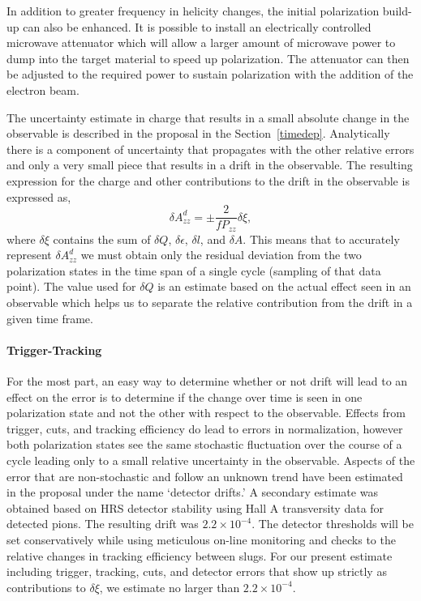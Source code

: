 In addition to greater frequency in helicity changes, the initial polarization build-up
can also be enhanced.  It is possible to install an electrically controlled microwave attenuator which will allow a larger amount of microwave power to dump into the target material to speed up polarization.  The attenuator can then be adjusted to the required power to sustain polarization with the addition of the electron beam.  

The uncertainty estimate in charge that results in a small absolute change in the observable is described
in the proposal in the Section~\ref{timedep}.  Analytically there is a component of uncertainty that propagates with the other
relative errors and only a very small piece that results in a drift in the observable.
The resulting expression for the charge and other contributions to the drift in the observable is expressed as,
\begin{equation}
\delta A^d_{zz}=\pm \frac{2}{fP_{zz}}\delta\xi,
\label{drift}
\end{equation}
where $\delta\xi$ contains the sum of $\delta Q$, $\delta \epsilon$, $\delta l$, and $\delta A$.  This means that
to accurately represent $\delta A^d_{zz}$ we must obtain only the residual deviation from the two polarization
states in the time span of a single cycle (sampling of that data point).  The value used for $\delta Q$ is an estimate based
on the actual effect seen in an observable which helps us to separate the relative contribution from the drift in a given time frame.

\paragraph{Trigger-Tracking}
\label{acc}
For the most part, an easy way to determine whether or not drift will lead to an
effect on the error is to determine if the change over time is seen in one polarization state and not the
other with respect to the observable.  Effects from trigger, cuts, and tracking efficiency do lead to errors in normalization,
however both polarization states see the same stochastic fluctuation over the course of a cycle leading only to a small relative uncertainty in the observable.  Aspects of the error that are non-stochastic
and follow an unknown trend have been estimated in the proposal under the name `detector drifts.'
A secondary estimate was obtained based on HRS detector stability using Hall A transversity data for
detected pions.  The resulting drift was $2.2\times10^{-4}$.
The detector thresholds will be set conservatively while using meticulous on-line monitoring and checks to the relative changes in tracking efficiency between slugs.  For our present estimate including trigger, tracking, cuts, and detector errors that show up strictly as contributions to $\delta\xi$, we estimate no larger than $2.2\times10^{-4}$.

